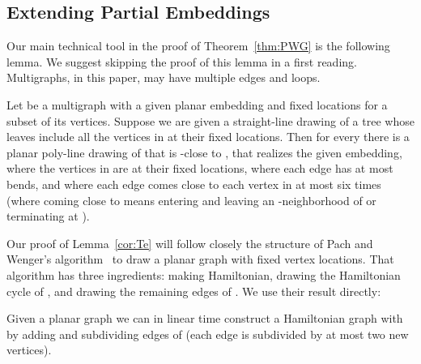 \documentclass{llncs}
\newcommand{\remove}[1]{}
\begin{document}
\remove{
Lemma~\ref{lem:fw} allows us to replace a facial boundary with a
{\em polygonal region},
that is, a collection of
simple polygons that bound a face which is very close to the original boundary, has bounded complexity, and can be constructed efficiently. This leads to a proof of Lemma~\ref{cor:fw}. Namely, approximate each facial walk of the facial boundary with an -close
polygon lying in . The
result is a polygonal region
as long as  is less than half the distance between any two non-adjacent vertices or edges. The upper bound of  will generally be a large overestimate, but allows for the possibility that all the inner walks are walks on isolated vertices. If there are no isolated vertices, then a walk of size  gets replaced by a polygon of size at most  (a tight bound for ), proving the slightly sharper upper bound.
}

\subsection{Extending Partial Embeddings}\label{sec:EPP}

Our main technical tool in the proof of Theorem~\ref{thm:PWG} is the following lemma. We suggest skipping the proof of this lemma in a first reading. Multigraphs, in this paper, may have multiple edges and loops.

\begin{lemma}\label{cor:Te}
Let  be a multigraph with a given planar embedding and fixed locations for a subset  of its vertices. Suppose we are given a straight-line drawing of a tree  whose leaves include all the vertices in  at their fixed locations. Then for every  there is a planar poly-line drawing of  that is -close to , that realizes the given embedding, where the vertices in  are at their fixed locations, where each edge has at most  bends, and where each edge comes close to each vertex  in  at most six times (where coming close to  means entering and leaving an -neighborhood of  or terminating at ).
\end{lemma}

Our proof of Lemma~\ref{cor:Te} will follow closely the structure of Pach and Wenger's algorithm~\cite{PW01} to draw a planar graph with fixed vertex locations. That algorithm has three ingredients:  making  Hamiltonian,  drawing the Hamiltonian cycle of , and  drawing the remaining edges of . We use their result  directly:

\begin{lemma}\label{lem:PWHam}
  Given a planar graph  we can in linear time construct a Hamiltonian graph  with  by adding and subdividing edges of  (each edge is subdivided by at most two new vertices). \end{lemma}
\end{document}
